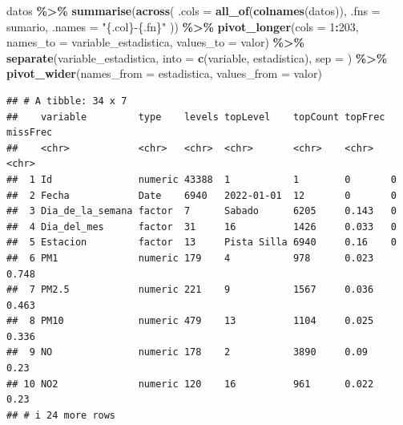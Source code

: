 \documentclass[notspecified,article,submit,moreauthors,pdftex]{Definitions/mdpi}
\newenvironment{Shaded}{\begin{snugshade}}{\end{snugshade}}
\newcommand{\AttributeTok}[1]{\textcolor[rgb]{0.13,0.29,0.53}{#1}}
\newcommand{\DecValTok}[1]{\textcolor[rgb]{0.00,0.00,0.81}{#1}}
\newcommand{\FunctionTok}[1]{\textcolor[rgb]{0.13,0.29,0.53}{\textbf{#1}}}
\newcommand{\NormalTok}[1]{#1}
\newcommand{\SpecialCharTok}[1]{\textcolor[rgb]{0.81,0.36,0.00}{\textbf{#1}}}
\newcommand{\StringTok}[1]{\textcolor[rgb]{0.31,0.60,0.02}{#1}}
\begin{document}
\begin{Shaded}
\begin{Highlighting}[]
\NormalTok{datos }\SpecialCharTok{\%\textgreater{}\%}
  \FunctionTok{summarise}\NormalTok{(}\FunctionTok{across}\NormalTok{(}
    \AttributeTok{.cols =} \FunctionTok{all\_of}\NormalTok{(}\FunctionTok{colnames}\NormalTok{(datos)),}
    \AttributeTok{.fns =}\NormalTok{ sumario,}
    \AttributeTok{.names =} \StringTok{"\{.col\}{-}\{.fn\}"}
\NormalTok{  )) }\SpecialCharTok{\%\textgreater{}\%}
  \FunctionTok{pivot\_longer}\NormalTok{(}\AttributeTok{cols =} \DecValTok{1}\SpecialCharTok{:}\DecValTok{203}\NormalTok{,}
               \AttributeTok{names\_to =} \StringTok{\textquotesingle{}variable\_estadistica\textquotesingle{}}\NormalTok{,}
               \AttributeTok{values\_to =} \StringTok{\textquotesingle{}valor\textquotesingle{}}\NormalTok{) }\SpecialCharTok{\%\textgreater{}\%}
  \FunctionTok{separate}\NormalTok{(variable\_estadistica,}
           \AttributeTok{into =}  \FunctionTok{c}\NormalTok{(}\StringTok{\textquotesingle{}variable\textquotesingle{}}\NormalTok{, }\StringTok{\textquotesingle{}estadistica\textquotesingle{}}\NormalTok{),}
           \AttributeTok{sep =} \StringTok{\textquotesingle{}{-}\textquotesingle{}}\NormalTok{) }\SpecialCharTok{\%\textgreater{}\%}
  \FunctionTok{pivot\_wider}\NormalTok{(}\AttributeTok{names\_from =} \StringTok{\textquotesingle{}estadistica\textquotesingle{}}\NormalTok{, }\AttributeTok{values\_from =} \StringTok{\textquotesingle{}valor\textquotesingle{}}\NormalTok{)}
\end{Highlighting}
\end{Shaded}

\begin{verbatim}
## # A tibble: 34 x 7
##    variable         type    levels topLevel    topCount topFrec missFrec
##    <chr>            <chr>   <chr>  <chr>       <chr>    <chr>   <chr>   
##  1 Id               numeric 43388  1           1        0       0       
##  2 Fecha            Date    6940   2022-01-01  12       0       0       
##  3 Dia_de_la_semana factor  7      Sabado      6205     0.143   0       
##  4 Dia_del_mes      factor  31     16          1426     0.033   0       
##  5 Estacion         factor  13     Pista Silla 6940     0.16    0       
##  6 PM1              numeric 179    4           978      0.023   0.748   
##  7 PM2.5            numeric 221    9           1567     0.036   0.463   
##  8 PM10             numeric 479    13          1104     0.025   0.336   
##  9 NO               numeric 178    2           3890     0.09    0.23    
## 10 NO2              numeric 120    16          961      0.022   0.23    
## # i 24 more rows
\end{verbatim}
\end{document}
